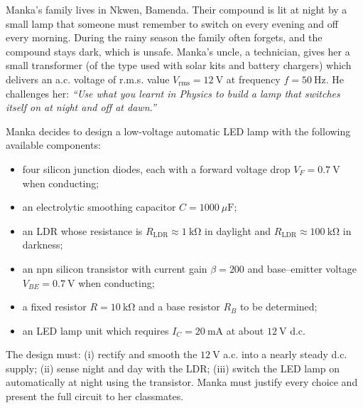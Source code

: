 \documentclass[11pt]{article}
\newcounter{popsec}
\newcounter{popsub}
\newcommand{\courssub}[1]{%
  \stepcounter{popsub}%
  \par\vspace{9pt}\noindent{\popxbold\fontsize{11.5}{13}\selectfont\color{popink}{\color{poporange}\thepopsec.\thepopsub}\hspace{6pt}#1}\par\nopagebreak\vspace{4pt}
}
\begin{document}
\begin{experience}
Manka's family lives in Nkwen, Bamenda. Their compound is lit at night by a small lamp that someone must remember to switch on every evening and off every morning. During the rainy season the family often forgets, and the compound stays dark, which is unsafe. Manka's uncle, a technician, gives her a small transformer (of the type used with solar kits and battery chargers) which delivers an a.c. voltage of r.m.s. value $V_{\mathrm{rms}} = 12\ \mathrm{V}$ at frequency $f = 50\ \mathrm{Hz}$. He challenges her: \emph{``Use what you learnt in Physics to build a lamp that switches itself on at night and off at dawn.''}

Manka decides to design a low-voltage automatic LED lamp with the following available components:

\begin{itemize}
\item four silicon junction diodes, each with a forward voltage drop $V_F = 0.7\ \mathrm{V}$ when conducting;
\item an electrolytic smoothing capacitor $C = 1000\ \mu\mathrm{F}$;
\item an LDR whose resistance is $R_{\mathrm{LDR}} \approx 1\ \mathrm{k\Omega}$ in daylight and $R_{\mathrm{LDR}} \approx 100\ \mathrm{k\Omega}$ in darkness;
\item an npn silicon transistor with current gain $\beta = 200$ and base--emitter voltage $V_{BE} = 0.7\ \mathrm{V}$ when conducting;
\item a fixed resistor $R = 10\ \mathrm{k\Omega}$ and a base resistor $R_B$ to be determined;
\item an LED lamp unit which requires $I_C = 20\ \mathrm{mA}$ at about $12\ \mathrm{V}$ d.c.
\end{itemize}

The design must: (i) rectify and smooth the $12\ \mathrm{V}$ a.c. into a nearly steady d.c. supply; (ii) sense night and day with the LDR; (iii) switch the LED lamp on automatically at night using the transistor. Manka must justify every choice and present the full circuit to her classmates.
\end{experience}

\courssub{Tasks}
\end{document}
